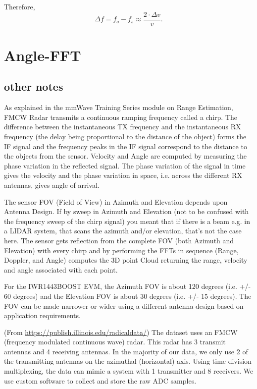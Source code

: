 \documentclass[11pt, oneside]{article}   	%
\begin{document}
Therefore, $$\Delta f = f_o - f_s \approx \frac{2\cdot \Delta v}{v}.$$

\section{Angle-FFT}

\subsection{other notes}

As explained in the mmWave Training Series module on Range Estimation, FMCW Radar transmits a continuous ramping frequency called a chirp. The difference between the instantaneous TX frequency and the instantaneous RX frequency (the delay being proportional to the distance of the object) forms the IF signal and the frequency peaks in the IF signal correspond to the distance to the objects from the sensor. Velocity and Angle are computed by measuring the phase variation in the reflected signal. The phase variation of the signal in time gives the velocity and the phase variation in space, i.e. across the different RX antennas, gives angle of arrival.

The sensor FOV (Field of View) in Azimuth and Elevation depends upon Antenna Design. If by sweep in Azimuth and Elevation (not to be confused with the frequency sweep of the chirp signal) you meant that if there is a beam e.g. in a LIDAR system, that scans the azimuth and/or elevation, that's not the case here. The sensor gets reflection from the complete FOV (both Azimuth and Elevation) with every chirp and by performing the FFTs in sequence (Range, Doppler, and Angle) computes the 3D point Cloud returning the range, velocity and angle associated with each point.

For the IWR1443BOOST EVM, the Azimuth FOV is about 120 degrees (i.e. +/- 60 degrees) and the Elevation FOV is about 30 degrees (i.e. +/- 15 degrees). The FOV can be made narrower or wider using a different antenna design based on application requirements.


(From \url{https://publish.illinois.edu/radicaldata/}) The dataset uses an FMCW (frequency modulated continuous wave) radar. This radar has 3 transmit antennas and 4 receiving antennas. In the majority of our data, we only use 2 of the transmitting antennas on the azimuthal (horizontal) axis. Using time division multiplexing, the data can mimic a system with 1 transmitter and 8 receivers. We use custom software to collect and store the raw ADC samples.
\end{document}
